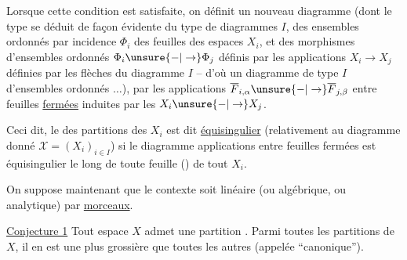 Lorsque cette condition est satisfaite, on définit un nouveau diagramme (dont le type se déduit de façon évidente du type de diagrammes $I$, des ensembles ordonnés par incidence  $\Phi_i$ des feuilles des espaces $X_i$, et des morphismes d'ensembles ordonnés  $\Phi_i\unsure{-|\to}\Phi_j$ définis par les  applications $X_i\to X_j$ définies par les flèches du diagramme $I$ -- d'où un diagramme  de type $I$ d'ensembles ordonnés $\ldots$), par les applications $\overline F_{i,\alpha}\unsure{-|\to}\overline F_{j,\beta}$ entre feuilles \uline{fermées} induites par les $X_i\unsure{-|\to}X_j$.

Ceci dit, le  des partitions des $X_i$ est dit \uline{équisingulier} (relativement au diagramme donné $\mathcal X=(X_i)_{i\in I}$) si  le diagramme   applications entre feuilles fermées est équisingulier le long de toute feuille () de tout $X_i$.


On suppose maintenant que le contexte soit linéaire (ou algébrique, ou analytique) par \uline{morceaux}.

\uline{Conjecture 1} Tout espace $X$ admet une partition . Parmi toutes les partitions  de $X$, il en est une plus grossière que toutes les autres (appelée ``canonique'').
